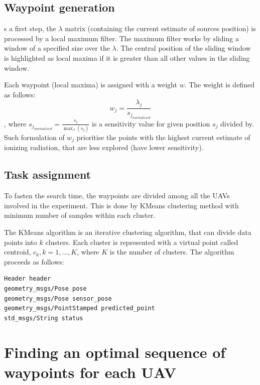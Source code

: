 \subsection{Waypoint generation}
s a first step, the $\lambda$ matrix (containing the current estimate of sources position) is processed by a local maximum filter. 
The maximum filter works by sliding a window of a specified size over the $\lambda$.
The central position of the sliding window is highlighted as local maxima if it is greater than all other values in the sliding window.

Each waypoint (local maxima) is assigned with a weight $w$.
The weight is defined as follows:
\begin{equation}
  w_{j} = \frac{\lambda_{j}}{s_{j_{normalised}}}
\end{equation},
where $s_{j_{normalised}} = \frac{s_{j}}{\max_{J}( s_{j})}$ is a sensitivity value for given position $s_{j}$ divided by.
Such formulation of $w_{j}$ prioritise the points with the highest current estimate of ionizing radiation, that are less explored (have lower sensitivity).

\subsection{Task assignment}

To fasten the search time, the waypoints are divided among all the \ac{UAV}s involved in the experiment.
This is done by KMeans clustering method with minimum number of samples within each cluster.

The KMeans algorithm is an iterative clustering algorithm, that can divide data points into $k$ clusters.
Each cluster is represented with a virtual point called centroid, $c_{k}, k = 1, ... , K$, where $K$ is the number of clusters.
The algorithm proceeds as follows:

\begin{lstlisting}[caption={DroneDataMsg.msg (caption)}, title={Custom message for data sharing between \ac{UAV} and central unit.}, label={code1}]
Header header
geometry_msgs/Pose pose
geometry_msgs/Pose sensor_pose
geometry_msgs/PointStamped predicted_point
std_msgs/String status
\end{lstlisting}








\section{Finding an optimal sequence of waypoints for each \ac{UAV}}


